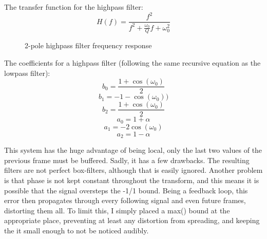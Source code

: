\documentclass[11pt,a4paper]{article}
\begin{document}
The transfer function for the highpass filter:
\begin{equation}
H(f) = \frac{f^2}{f^2 + \frac{\omega_0}{Q}f + \omega_0^2}
\end{equation}


\begin{figure}[ht]
\caption{2-pole highpass filter frequency response}
\centering
{}

\end{figure}


The coefficients for a highpass filter (following the same recursive equation as the lowpass filter):
\begin{equation}
b_0 = \frac{1 + \cos(\omega_0)}{2}
\end{equation}
\begin{equation}
b_1 = -1 - \cos(\omega_0))
\end{equation}
\begin{equation}
b_2 = \frac{1 + \cos(\omega_0)}{2}
\end{equation}
\begin{equation}
a_0 = 1 + \alpha
\end{equation}
\begin{equation}
a_1 = -2\cos(\omega_0)
\end{equation}
\begin{equation}
a_2 = 1 - \alpha
\end{equation}

This system has the huge advantage of being local, only the last two values of the previous frame must be buffered.
Sadly, it has a few drawbacks. The resulting filters are not perfect box-filters, although that is easily ignored. Another problem is that phase is not kept constant throughout the transform, and this means it is possible that the signal oversteps the -1/1 bound. Being a feedback loop, this error then propagates through every following signal and even future frames, distorting them all.
To limit this, I simply placed a max() bound at the appropriate place, preventing at least any distortion from spreading, and keeping the it small enough to not be noticed audibly.
\end{document}
